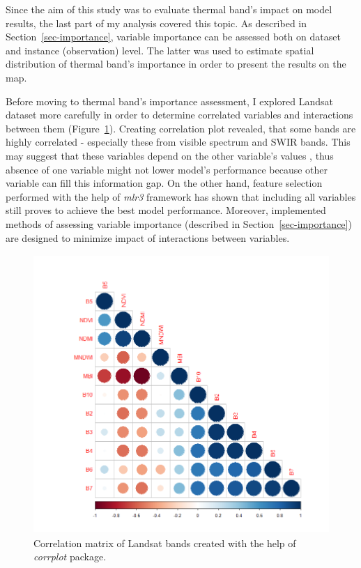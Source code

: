 \documentclass{amuthesis}
\begin{document}
Since the aim of this study was to evaluate thermal band's impact on
model results, the last part of my analysis covered this topic. As
described in Section~\ref{sec-importance}, variable importance can be
assessed both on dataset and instance (observation) level. The latter
was used to estimate spatial distribution of thermal band's importance
in order to present the results on the map.

Before moving to thermal band's importance assessment, I explored
Landsat dataset more carefully in order to determine correlated
variables and interactions between them (Figure~\ref{fig-rycina19}).
Creating correlation plot revealed, that some bands are highly
correlated - especially these from visible spectrum and SWIR bands. This
may suggest that these variables depend on the other variable's values
\autocite{biecek_explanatory_2021}, thus absence of one variable might
not lower model's performance because other variable can fill this
information gap. On the other hand, feature selection performed with the
help of \emph{mlr3} framework \autocite{R-mlr3} has shown that including
all variables still proves to achieve the best model performance.
Moreover, implemented methods of assessing variable importance
(described in Section~\ref{sec-importance}) are designed to minimize
impact of interactions between variables.

\begin{figure}[H]

{\centering \includegraphics[width=4.45833in,height=4.16667in]{./figures/corrplot.png}

}

\caption{\label{fig-rycina19}Correlation matrix of Landsat bands created
with the help of \emph{corrplot} package.}

\end{figure}
\end{document}
